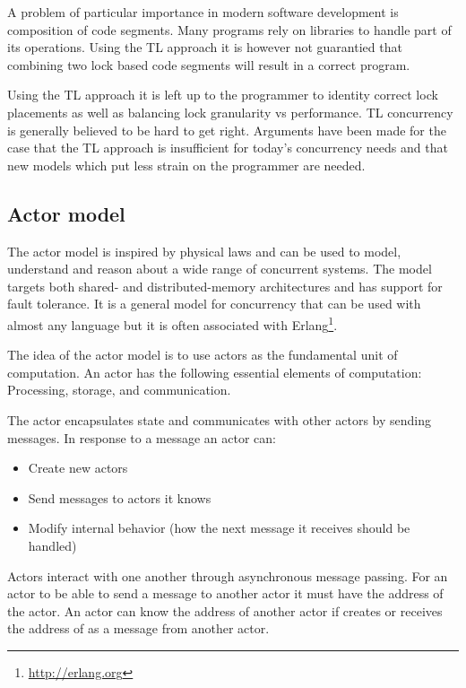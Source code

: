 A problem of particular importance in modern software development is composition of code segments. Many programs rely on libraries to handle part of its operations. Using the \ac{TL} approach it is however not guarantied that combining two lock based code segments will result in a correct program\cite[p. 56]{sutter2005software}.

Using the \ac{TL} approach it is left up to the programmer to identity correct lock placements as well as balancing lock granularity vs performance\cite[p. 49]{harris2005composable}. \ac{TL} concurrency is generally believed to be hard to get right\cite[p. 92]{herlihy2003software}. Arguments have been made for the case that the \ac{TL} approach is insufficient for today's concurrency needs and that new models which put less strain on the programmer are needed\cite[p. 3]{jones2007beautiful}\cite[p. 48]{harris2005composable}.

\subsection{Actor model}
The actor model is inspired by physical laws and can be used to model, understand and reason about a wide range of concurrent systems\cite{hewitt2014actor}. The model targets both shared- and distributed-memory architectures and has support for fault tolerance\cite[Chap. 5]{sevenModels}. It is a general model for concurrency that can be used with almost any language but it is often associated with Erlang\footnote{\url{http://erlang.org}}.
 
The idea of the actor model is to use actors as the fundamental unit of computation. An actor has the following essential elements of computation\cite{actorLangNextVideo}: Processing, storage, and communication.

The actor encapsulates state and communicates with other actors by sending messages. In response to a message an actor can\cite{hewitt2014actor}:
\begin{itemize}
\item Create new actors
\item Send messages to actors it knows
\item Modify internal behavior (how the next message it receives should be handled)
\end{itemize}
Actors interact with one another through asynchronous message passing. For an actor to be able to send a message to another actor it must have the address of the actor. An actor  can know the address of another actor  if  creates  or receives the address of  as a message from another actor.

